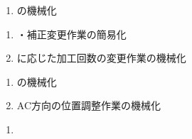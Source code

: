 \begin{enumerate}[label=\sarrow]
\item \CurvedOutcutMilling の機械化
\end{enumerate}



\begin{enumerate}[label=\sarrow]
\item \KeywayPos・\KeywayWidth 補正変更作業の簡易化
\item \KeywayWidth に応じた加工回数の変更作業の機械化
\end{enumerate}



\begin{enumerate}[label=\sarrow]
\item \EndFaceChamferMilling の機械化
\item AC方向の位置調整作業の機械化
\end{enumerate}



\begin{enumerate}[label=\sarrow]
\item
\end{enumerate}


